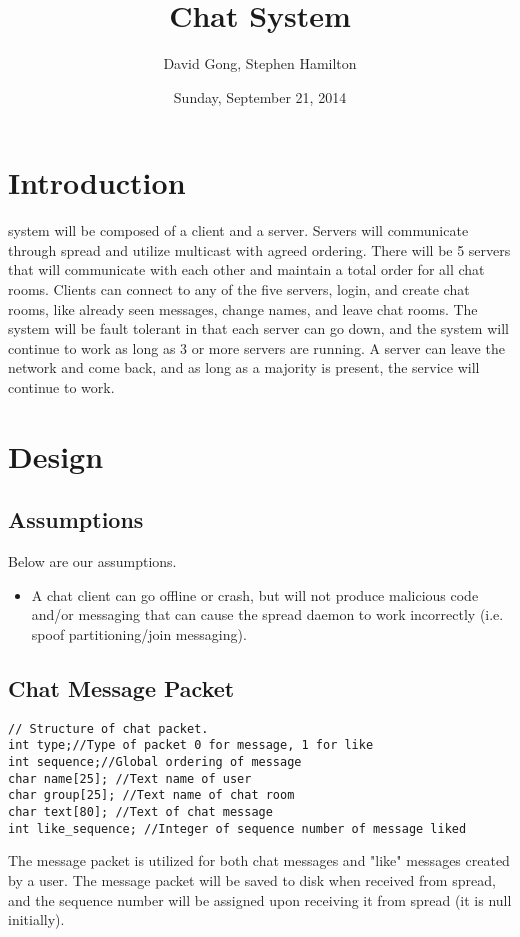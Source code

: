 \documentclass[12pt,journal,compsoc]{IEEEtran}
\begin{document}
\title{Chat System}
\author{David Gong, Stephen Hamilton}%
\date{Sunday, September 21, 2014}
\maketitle
\section{Introduction}
 system will be composed of a client and a server.  Servers will communicate through spread and utilize multicast with agreed ordering.  There will be 5 servers that will communicate with each other and maintain a total order for all chat rooms.  Clients can connect to any of the five servers, login, and create chat rooms, like already seen messages, change names, and leave chat rooms.  The system will be fault tolerant in that each server can go down, and the system will continue to work as long as 3 or more servers are running.  A server can leave the network and come back, and as long as a majority is present, the service will continue to work.
\section{Design}
\subsection{Assumptions}
Below are our assumptions.
\begin{itemize}
\item A chat client can go offline or crash, but will not produce malicious code and/or messaging that can cause the spread daemon to work incorrectly (i.e. spoof partitioning/join messaging).
\end{itemize}
\subsection{Chat Message Packet}
\begin{lstlisting}
// Structure of chat packet.
int type;//Type of packet 0 for message, 1 for like
int sequence;//Global ordering of message
char name[25]; //Text name of user
char group[25]; //Text name of chat room
char text[80]; //Text of chat message
int like_sequence; //Integer of sequence number of message liked
\end{lstlisting}
The message packet is utilized for both chat messages and "like" messages created by a user.  The message packet will be saved to disk when received from spread, and the sequence number will be assigned upon receiving it from spread (it is null initially).
\end{document}
